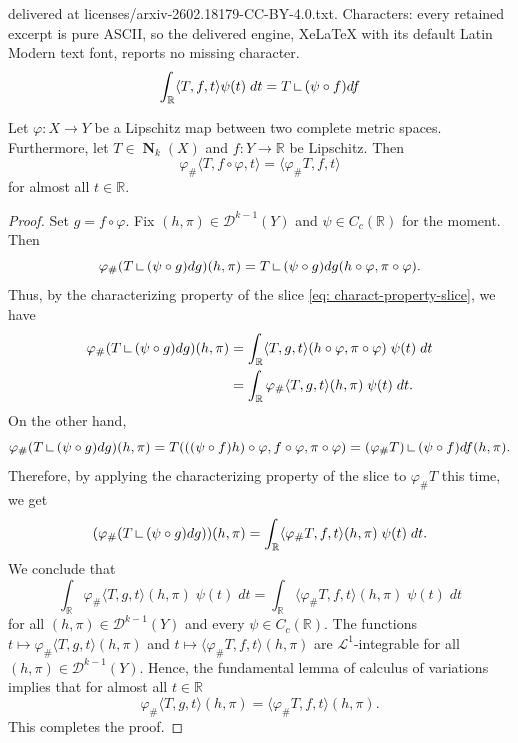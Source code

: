 \documentclass[10pt,a4paper]{amsart}
\DeclareMathOperator{\bN}{\mathbf{N}}
\newcommand{\R}{\mathbb{R}}
\newcommand{\leb}{\mathcal{L}}
\newcommand{\on}{\:\mbox{\rule{0.1ex}{1.2ex}\rule{1.1ex}{0.1ex}}\:}
\begin{document}
delivered at licenses/arxiv-2602.18179-CC-BY-4.0.txt. Characters: every retained excerpt is pure ASCII, so the delivered engine, XeLaTeX with its default Latin Modern text font, reports no missing character.
        \begin{equation}\label{eq: charact-property-slice}
            \int_\R \langle T, f, t\rangle \psi(t) \; dt = T\on(\psi \circ f)df
        \end{equation}

        \begin{lemma}\label{lemma: pushfw-slice-is-slice-phsfwd-normal}
            Let $\varphi \colon X \to Y$ be a Lipschitz map between two complete metric spaces. Furthermore, let $T \in \bN_k(X)$ and $f\colon Y\to\R$ be Lipschitz. Then 
            $$\varphi_\#\langle T, f\circ \varphi, t \rangle = \langle \varphi_\# T, f, t \rangle$$
            for almost all $t \in \R$.
        \end{lemma}

        \begin{proof}
            Set $g = f\circ \varphi$. Fix $(h,\pi) \in \mathcal{D}^{k-1}(Y)$ and $\psi \in C_c(\R)$ for the moment. Then
            $$\varphi_\#(T\on (\psi \circ g)dg)(h,\pi)= T\on (\psi\circ g)dg(h\circ \varphi,\pi\circ\varphi).$$
            Thus, by the characterizing property of the slice \eqref{eq: charact-property-slice}, we have
            \begin{align*}
                \varphi_\#(T\on (\psi \circ g)dg)(h,\pi) &=\int_{\R} \langle T, g, t \rangle(h\circ \varphi,\pi\circ\varphi) \; \psi(t) \; dt
                \\
                &= \int_{\R}\varphi_\#\langle T, g, t \rangle(h,\pi) \; \psi(t) \; dt.
            \end{align*}
            On the other hand,
            $$\varphi_\#(T\on (\psi \circ g)dg)(h,\pi) = T(((\psi\circ f)h)\circ \varphi, f \circ \varphi, \pi \circ \varphi)= (\varphi_\#T)\on(\psi\circ f)df (h,\pi).$$
            Therefore, by applying the characterizing property of the slice to $\varphi_\#T$ this time, we get
            \begin{equation*}\label{eq: slice-pushfwd-2}
                (\varphi_\#(T\on (\psi \circ g)dg))(h,\pi) = \int_{\R} \langle \varphi_\# T, f, t\rangle(h,\pi)\; \psi(t) \; dt.
            \end{equation*}
            We conclude that 
            $$\int_{\R}\varphi_\#\langle T, g, t \rangle(h,\pi) \; \psi(t) \; dt = \int_{\R} \langle \varphi_\# T, f, t\rangle(h,\pi)\; \psi(t) \; dt$$
            for all $(h,\pi) \in \mathcal{D}^{k-1}(Y)$ and every $\psi \in C_c(\R)$. The functions $t \mapsto \varphi_\#\langle T, g, t \rangle(h,\pi)$ and $t \mapsto \langle \varphi_\#T, f, t \rangle(h,\pi)$ are $\leb^1$-integrable for all $(h,\pi) \in \mathcal{D}^{k-1}(Y)$. Hence, the fundamental lemma of calculus of variations implies that for almost all $t \in \R$
            $$\varphi_\#\langle T, g, t \rangle(h,\pi) = \langle \varphi_\#T, f, t \rangle(h,\pi).$$
            This completes the proof.
        \end{proof}
\end{document}
